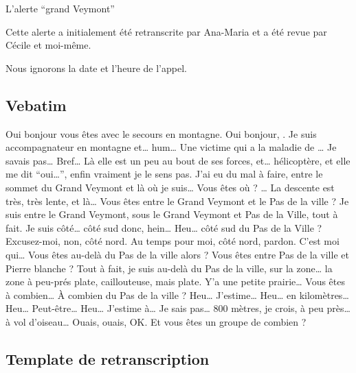 L'alerte \enquote{grand Veymont}


Cette alerte a initialement été retranscrite par Ana-Maria
 et a été revue par Cécile  et
moi-même.

Nous ignorons la date et l'heure de l'appel.

\subsection{Vebatim}
\label{anx:retrans-gv-verb}


\begin{dialogue*}
  \Sec Oui bonjour vous êtes avec le secours en montagne.
  \Req Oui bonjour, . Je suis accompagnateur en
  montagne et… hum… Une victime qui a la maladie de …
  Je savais pas… Bref… Là elle est un peu au bout de ses forces, et…
   hélicoptère, et elle me dit \enquote{oui…}, enfin
  vraiment je le sens pas. J'ai eu du mal à faire, entre le sommet du
  Grand Veymont et là où je suis…
  \Sec {} Vous êtes où ?
  \Req … La descente est très, très lente, et là…
  \Sec {} Vous êtes entre le Grand Veymont
  et le Pas de la ville ?
  \Req Je suis entre le Grand Veymont, sous le Grand Veymont et Pas de
  la Ville, tout à fait. Je suis côté… côté sud donc, hein…
  \Sec Heu… côté sud du Pas de la Ville ?
  \Req Excusez-moi, non, côté nord. Au temps pour moi, côté nord,
  pardon. C'est moi qui…
  \Sec Vous êtes au-delà du Pas de la ville alors ? Vous êtes entre
  Pas de la ville et Pierre blanche ?
  \Req Tout à fait, je suis au-delà du Pas de la ville, sur la zone…
  la zone à peu-prés plate, caillouteuse, mais plate. Y'a une petite
  prairie…
  \Sec Vous êtes à combien… À combien du Pas de la ville ?
  \Req Heu… J'estime… Heu… en kilomètres… Heu… Peut-être… Heu…
  J'estime à… Je sais pas… 800 mètres, je crois, à peu près… à vol
  d'oiseau…
  \Sec Ouais, ouais, OK. Et vous êtes un groupe de combien ?
\end{dialogue*}


\subsection{Template de retranscription}
\label{anx:retrans-gv-retrans}

